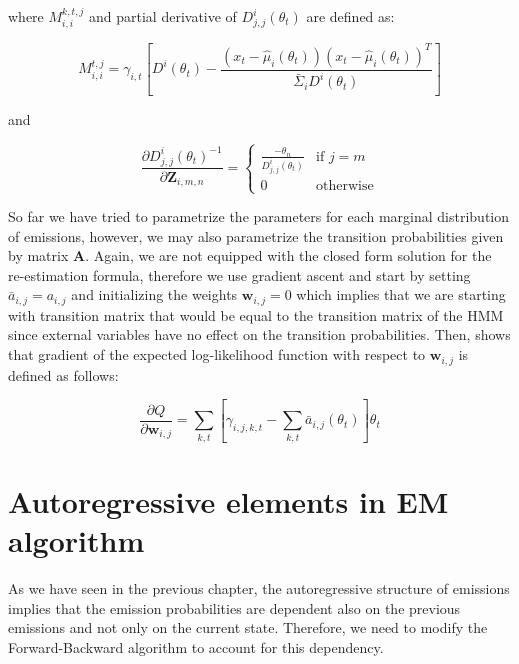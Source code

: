 where $M_{i,i}^{k,t,j}$ and partial derivative of $D_{j,j}^i(\theta_t)$ are defined as:

\begin{equation}
    M_{i,i}^{t,j} = \gamma_{i,t} \left[ D^i(\theta_t) - \frac{(x_t - \hat{\mu}_i(\theta_t))(x_t - \hat{\mu}_i(\theta_t))^T}{\bar{\Sigma}_i D^i(\theta_t)} \right]
\end{equation}

and 

\begin{equation}
    \frac{\partial D_{j,j}^i(\theta_t)^{-1}}{\partial \textbf{Z}_{i,m,n}} =
    \begin{cases} 
        \frac{-\theta_n}{D_{j,j}^i(\theta_t)} & \text{if } j = m \\
        0 & \text{otherwise}
    \end{cases}
\end{equation}

So far we have tried to parametrize the parameters for each marginal distribution of emissions, however, we may also parametrize the transition probabilities
given by matrix $\textbf{A}$. Again, we are not equipped with the closed form solution for the re-estimation formula, therefore we use gradient ascent and start by setting $\bar{a}_{i,j} = a_{i,j}$
and initializing the weights $\textbf{w}_{i,j}=0$ which implies that we are starting with transition matrix that would be equal to the transition matrix of the HMM since 
external variables have no effect on the transition probabilities. Then, \citep{Radenen2014} shows that gradient of the expected log-likelihood function with respect to
$\textbf{w}_{i,j}$ is defined as follows:

\begin{equation}
    \frac{\partial Q}{\partial \textbf{w}_{i,j}} = \sum_{k,t} \left[\gamma_{i,j,k,t} - \sum_{k,t} \bar{a}_{i,j}(\theta_t) \right] \theta_t
\end{equation}

\section{Autoregressive elements in EM algorithm}

As we have seen in the previous chapter, the autoregressive structure of emissions implies that the emission probabilities are dependent also on the previous emissions and not only 
on the current state. Therefore, we need to modify the Forward-Backward algorithm to account for this dependency. \citep{Xuan2004}

